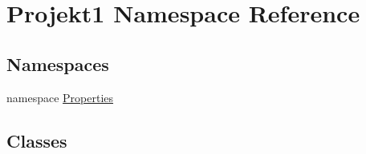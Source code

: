 \hypertarget{namespace_projekt1}{}\section{Projekt1 Namespace Reference}
\label{namespace_projekt1}
\subsection*{Namespaces}
\begin{DoxyCompactItemize}
\item 
namespace \mbox{\hyperlink{namespace_projekt1_1_1_properties}{Properties}}
\end{DoxyCompactItemize}
\subsection*{Classes}
